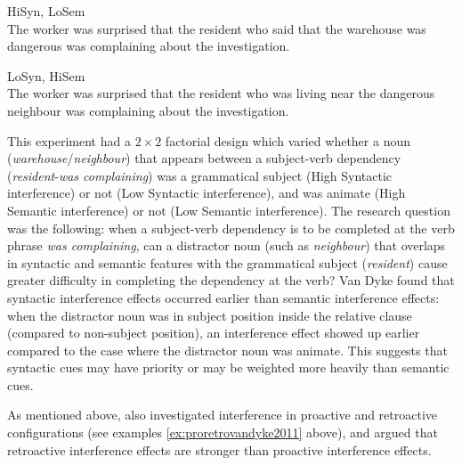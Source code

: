 \documentclass{cambridge7A}\usepackage[]{graphicx}\usepackage[]{color}
\begin{document}
\begin{exe}
\ex\label{vd07b}
\begin{xlist}
\item HiSyn, LoSem\\
The worker was surprised that the resident who said that the warehouse was dangerous was complaining about the investigation.
\item LoSyn, HiSem\\
The worker was surprised that the resident who was living near the dangerous neighbour was complaining about the investigation.
\end{xlist}
\end{exe}

This experiment had a $2\times 2$ factorial design which varied whether a noun (\textit{warehouse}/\textit{neighbour})  that appears between a subject-verb dependency (\textit{resident}-\textit{was complaining}) was a grammatical subject (High Syntactic interference) or not (Low Syntactic interference), and was animate (High Semantic interference) or not (Low Semantic interference).  The research question was the following: when a subject-verb dependency is to be completed at the verb phrase \textit{was complaining}, can a distractor noun (such as \textit{neighbour}) that overlaps in syntactic and semantic features with the grammatical subject (\textit{resident}) cause greater difficulty in completing the dependency at the verb?
Van Dyke found that syntactic interference effects occurred earlier than semantic interference effects: when the distractor noun was in subject position inside the relative clause (compared to non-subject position), an interference effect showed up earlier compared to the case where the distractor noun was animate. This suggests that syntactic cues may have priority or may be weighted more heavily than semantic cues.

As mentioned above, \cite{VanDykeMcElree2011} also investigated interference in  proactive and  retroactive configurations (see examples \ref{ex:proretrovandyke2011} above), and argued that  retroactive interference effects are stronger than  proactive interference effects.
\end{document}
